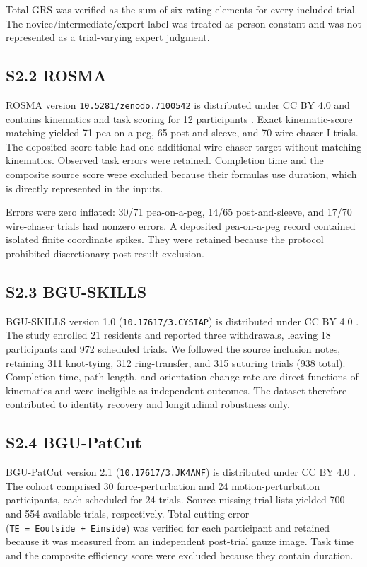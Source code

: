 \documentclass[11pt]{article}
\begin{document}
Total GRS was verified as the sum of six rating elements for every
included trial. The novice/intermediate/expert label was treated as
person-constant and was not represented as a trial-varying expert
judgment.

\subsection{S2.2 ROSMA}\label{s2.2-rosma}

ROSMA version \texttt{10.5281/zenodo.7100542} is distributed under CC BY
4.0 and contains kinematics and task scoring for 12 participants
\citep{RivasBlanco2023, ROSMAData2022}. Exact kinematic-score matching
yielded 71 pea-on-a-peg, 65 post-and-sleeve, and 70 wire-chaser-I
trials. The deposited score table had one additional wire-chaser target
without matching kinematics. Observed task errors were retained.
Completion time and the composite source score were excluded because
their formulas use duration, which is directly represented in the
inputs.

Errors were zero inflated: 30/71 pea-on-a-peg, 14/65 post-and-sleeve,
and 17/70 wire-chaser trials had nonzero errors. A deposited
pea-on-a-peg record contained isolated finite coordinate spikes. They
were retained because the protocol prohibited discretionary post-result
exclusion.

\subsection{S2.3 BGU-SKILLS}\label{s2.3-bgu-skills}

BGU-SKILLS version 1.0 (\texttt{10.17617/3.CYSIAP}) is distributed under
CC BY 4.0 \citep{BGUSkillsData2025}. The study enrolled 21 residents and
reported three withdrawals, leaving 18 participants and 972 scheduled
trials. We followed the source inclusion notes, retaining 311
knot-tying, 312 ring-transfer, and 315 suturing trials (938 total).
Completion time, path length, and orientation-change rate are direct
functions of kinematics and were ineligible as independent outcomes. The
dataset therefore contributed to identity recovery and longitudinal
robustness only.

\subsection{S2.4 BGU-PatCut}\label{s2.4-bgu-patcut}

BGU-PatCut version 2.1 (\texttt{10.17617/3.JK4ANF}) is distributed under
CC BY 4.0 \citep{SharonPatCut2024, PatCutData2024}. The cohort comprised
30 force-perturbation and 24 motion-perturbation participants, each
scheduled for 24 trials. Source missing-trial lists yielded 700 and 554
available trials, respectively. Total cutting error
(\texttt{TE\ =\ Eoutside\ +\ Einside}) was verified for each participant
and retained because it was measured from an independent post-trial
gauze image. Task time and the composite efficiency score were excluded
because they contain duration.
\end{document}
